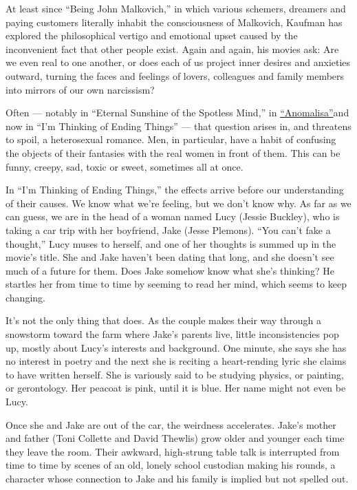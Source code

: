 At least since ``Being John Malkovich,'' in which various schemers,
dreamers and paying customers literally inhabit the consciousness of
Malkovich, Kaufman has explored the philosophical vertigo and emotional
upset caused by the inconvenient fact that other people exist. Again and
again, his movies ask: Are we even real to one another, or does each of
us project inner desires and anxieties outward, turning the faces and
feelings of lovers, colleagues and family members into mirrors of our
own narcissism?

Often --- notably in ``Eternal Sunshine of the Spotless Mind,'' in
\href{https://www.nytimes3xbfgragh.onion/2015/12/30/movies/review-anomalisa-pairs-charlie-kaufman-and-lonely-puppets.html}{``Anomalisa''}and
now in ``I'm Thinking of Ending Things'' --- that question arises in,
and threatens to spoil, a heterosexual romance. Men, in particular, have
a habit of confusing the objects of their fantasies with the real women
in front of them. This can be funny, creepy, sad, toxic or sweet,
sometimes all at once.

In ``I'm Thinking of Ending Things,'' the effects arrive before our
understanding of their causes. We know what we're feeling, but we don't
know why. As far as we can guess, we are in the head of a woman named
Lucy (Jessie Buckley), who is taking a car trip with her boyfriend, Jake
(Jesse Plemons). ``You can't fake a thought,'' Lucy muses to herself,
and one of her thoughts is summed up in the movie's title. She and Jake
haven't been dating that long, and she doesn't see much of a future for
them. Does Jake somehow know what she's thinking? He startles her from
time to time by seeming to read her mind, which seems to keep changing.

It's not the only thing that does. As the couple makes their way through
a snowstorm toward the farm where Jake's parents live, little
inconsistencies pop up, mostly about Lucy's interests and background.
One minute, she says she has no interest in poetry and the next she is
reciting a heart-rending lyric she claims to have written herself. She
is variously said to be studying physics, or painting, or gerontology.
Her peacoat is pink, until it is blue. Her name might not even be Lucy.

Once she and Jake are out of the car, the weirdness accelerates. Jake's
mother and father (Toni Collette and David Thewlis) grow older and
younger each time they leave the room. Their awkward, high-strung table
talk is interrupted from time to time by scenes of an old, lonely school
custodian making his rounds, a character whose connection to Jake and
his family is implied but not spelled out.


